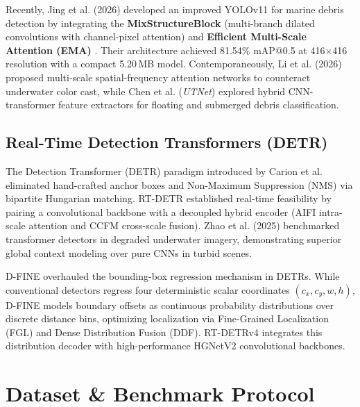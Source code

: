 \documentclass[conference]{IEEEtran}
\begin{document}
Recently, Jing et al. (2026) \cite{yolo11_base} developed an improved YOLOv11 for marine debris detection by integrating the \textbf{MixStructureBlock} (multi-branch dilated convolutions with channel-pixel attention) and \textbf{Efficient Multi-Scale Attention (EMA)} \cite{ema}. Their architecture achieved 81.54\% mAP@0.5 at 416$\times$416 resolution with a compact 5.20\,MB model. Contemporaneously, Li et al. (2026) \cite{li2026} proposed multi-scale spatial-frequency attention networks to counteract underwater color cast, while Chen et al. (\textit{UTNet}) \cite{utnet} explored hybrid CNN-transformer feature extractors for floating and submerged debris classification.

\subsection{Real-Time Detection Transformers (DETR)}
The Detection Transformer (DETR) paradigm introduced by Carion et al. \cite{detr} eliminated hand-crafted anchor boxes and Non-Maximum Suppression (NMS) via bipartite Hungarian matching. RT-DETR \cite{rtdetr} established real-time feasibility by pairing a convolutional backbone with a decoupled hybrid encoder (AIFI intra-scale attention and CCFM cross-scale fusion). Zhao et al. (2025) \cite{zhao2025} benchmarked transformer detectors in degraded underwater imagery, demonstrating superior global context modeling over pure CNNs in turbid scenes.

D-FINE \cite{dfine} overhauled the bounding-box regression mechanism in DETRs. While conventional detectors regress four deterministic scalar coordinates $(c_x, c_y, w, h)$, D-FINE models boundary offsets as continuous probability distributions over discrete distance bins, optimizing localization via Fine-Grained Localization (FGL) and Dense Distribution Fusion (DDF). RT-DETRv4 \cite{rtdetrv4} integrates this distribution decoder with high-performance HGNetV2 convolutional backbones.

\section{Dataset \& Benchmark Protocol}
\end{document}
